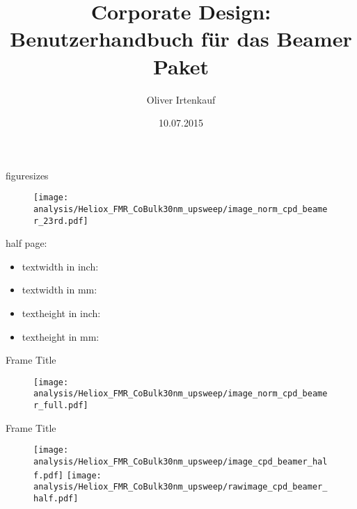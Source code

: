 \documentclass[rgb]{beamer}
\begin{document}
\setmainfont{Arial}
\setsansfont{Arial}


\title{Corporate Design: Benutzerhandbuch für das Beamer Paket}
\author{Oliver Irtenkauf} 
\date{10.07.2015}


\begin{frame}
	\titlepage
\end{frame}

\begin{frame}{figuresizes}

\begin{minipage}{.64\textwidth}
\begin{figure}
        \flushleft
        \texttt{[image: analysis/Heliox\_FMR\_CoBulk30nm\_upsweep/image\_norm\_cpd\_beamer\_23rd.pdf]}
    \end{figure}
\end{minipage}
\begin{minipage}{.34\textwidth}
half page:
\begin{itemize}
    \item textwidth in inch: \prntlen{\textwidth}
    \item textwidth in mm: \prntlen{\textwidth}
    
    \item textheight in inch: \prntlen{\textheight}
    \item textheight in mm: \prntlen{\textheight}
\end{itemize}
\end{minipage}

\end{frame}
\begin{frame}{Frame Title}
    \begin{figure}
        \centering
        \texttt{[image: analysis/Heliox\_FMR\_CoBulk30nm\_upsweep/image\_norm\_cpd\_beamer\_full.pdf]}
    \end{figure}
\end{frame}

\begin{frame}{Frame Title}
    \begin{figure}
        \centering
        \texttt{[image: analysis/Heliox\_FMR\_CoBulk30nm\_upsweep/image\_cpd\_beamer\_half.pdf]}
        \hspace{0.04\textwidth}
        \texttt{[image: analysis/Heliox\_FMR\_CoBulk30nm\_upsweep/rawimage\_cpd\_beamer\_half.pdf]}
    \end{figure}
\end{frame}
\end{document}
